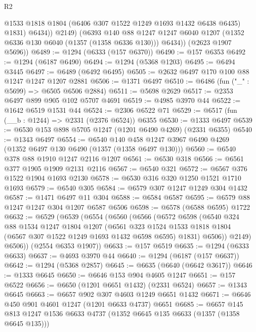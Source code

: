 \begin{lexlean}{R2}
\begin{coremodule}
                @1533
                @1818
                @1804
                (@6406 @307 @1522 @1249 @1693 @1432 @6438 @6435)
                @1831)
              @6434))
          @2149)
        (@6393
          @140
          @88
          @1247
          @1247
          @6040
          @1207
          (@1352 @6336 @130 @6040 (@1357 (@1358 @6336 @130)))
          @6434))
      (@2623 @1907 @5696))
@6489 := @1294 (@6333 (@157 @6370))
@6490 := @157 @6353
@6492 := @1294 (@6187 @6490)
@6494 := @1294 (@5368 @1203)
@6495 := @6494 @3445
@6497 := @6489 (@6492 @6495)
@6505 := @2632 @6497 @170 @100 @88 @1247 @1247 @1207 @2881
@6506 := @1371 @6497
@6510 := @6486 (fun ("_" : @5699) => @6505 @6506 @2884)
@6511 := @5698 @2629
@6517 := @2353 @6497 @899 @905 @102 @5707 @4691
@6519 := @4985 @3970 @44
@6522 := @1642 @6519 @1531 @44
@6524 := @2306 @6522 @71
@6529 := @6517 (fun (__b : @1244) => @2331 (@2376 @6524)) @6355
@6530 := @1333 @6497
@6539 := @6530 @153 @898 @5705 @1247 (@1201 @6490 @4269) (@2331 @6355)
@6540 := @1343 @6497
@6554 := @6540 @140 @458 @1247 @3967 @6490 @4269 (@1352 @6497 @130 @6490 (@1357 (@1358 @6497 @130)))
@6560 := @6540 @378 @88 @1910 @1247 @2116 @1207
@6561 := @6530 @318
@6566 := @6561 @377 @1905 @1909 @2131 @2116
@6567 := @6540 @321
@6572 := @6567 @376 @1522 @1904 @1693 @2130
@6578 := @6530 @316 @320 @1250 @1521 @1710 @1693
@6579 := @6540 @305
@6584 := @6579 @307 @1247 @1249 @304 @1432
@6587 := @1471 @6497 @11 @304
@6588 := @6584 @6587
@6595 := @6579 @88 @1247 @1247 @304 @1207 @6587 @6506
@6598 := @6578 (@6588 @6595) @1722
@6632 := @6529
    (@6539
      (@6554
        (@6560
          (@6566
            (@6572
              @6598
              (@6540
                @324
                @88
                @1534
                @1247
                @1804
                @1207
                (@6561
                  @323
                  @1524
                  @1533
                  @1818
                  @1804
                  (@6567 @307 @1522 @1249 @1693 @1432 @6598 @6595)
                  @1831)
                @6506))
            @2149)
          @6506))
      (@2554 @6353 @1907))
@6633 := @157 @6519
@6635 := @1294 (@6333 @6633)
@6637 := @4693 @3970 @44
@6640 := @1294 (@6187 (@157 @6637))
@6642 := @1294 (@5368 @2857)
@6645 := @6635 (@6640 (@6642 @3617))
@6646 := @1333 @6645
@6650 := @6646 @153 @904 @4605 @1247
@6651 := @157 @6522
@6656 := @6650 (@1201 @6651 @1432) (@2331 @6524)
@6657 := @1343 @6645
@6663 := @6657 @902 @307 @4603 @1249 @6651 @1432
@6671 := @6646 @450 @901 @4601 @1247 (@1201 @6633 @4737) @6651
@6685 := @6657 @145 @813 @1247 @1536 @6633 @4737 (@1352 @6645 @135 @6633 (@1357 (@1358 @6645 @135)))

\end{coremodule}
\end{lexlean}
